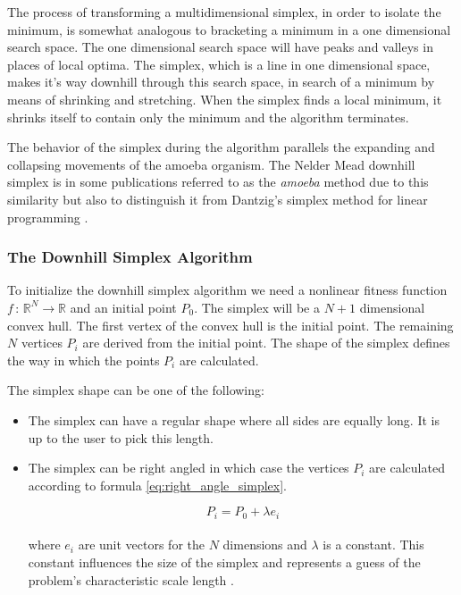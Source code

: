 \documentclass[11pt,a4paper]{report}
\begin{document}
The process of transforming a multidimensional simplex, in order to
isolate the minimum, is somewhat analogous to bracketing a minimum
in a one dimensional search space. The one dimensional search space will have
peaks and valleys in places of local optima. The simplex, which is a line in one
dimensional space, makes it's way downhill
through this search space, in search of a minimum by means of shrinking and
stretching. When the simplex finds a local minimum, it shrinks itself to contain
only the minimum and the algorithm terminates.

The behavior of the simplex during the algorithm parallels the expanding and
collapsing movements of the amoeba
organism. The Nelder Mead downhill simplex is in
some publications referred to as the \textit{amoeba} method due to this similarity but also to distinguish it from Dantzig's
simplex method for linear programming \cite{Press1992}. 


\subsubsection{The Downhill Simplex Algorithm}

To initialize the downhill simplex algorithm we need a nonlinear fitness function $f\,:\,\mathbb{R}^{N}\rightarrow\mathbb{R}$
and an initial point $P_{0}$. The simplex will be a $N+1$ dimensional convex
hull. The first vertex of the convex hull is the initial point. The remaining
$N$ vertices $P_{i}$ are derived from the initial point. The shape of the simplex defines the way in which the
points $P_{i}$ are calculated\cite{Nelder2009}.

The simplex shape can be one of the following:
\begin{itemize}
\item The simplex can have a regular shape where all sides are equally
long. It is up to the user to pick this length.
\item The simplex can be right angled in which case the vertices
$P_{i}$ are calculated according to formula \ref{eq:right_angle_simplex}.


\begin{equation}\label{eq:right_angle_simplex}
P_{i}=P_{0}+\lambda e_{i}
\end{equation}
\\
where $e_{i}$ are unit vectors for the $N$ dimensions and $\lambda$
is a constant. This constant influences the size of the simplex and
represents a guess of the problem's characteristic scale length \cite{Press1992}.
\end{itemize}
\end{document}
